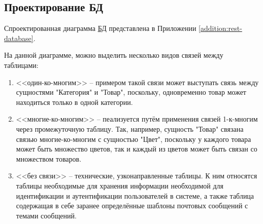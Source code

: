 \subsection{Проектирование БД}\label{subsec:design-db}\indent

Спроектированная диаграмма \hyperlink{gloss:db}{БД} представлена в Приложении \ref{addition:rest-database}.

На данной диаграмме, можно выделить несколько видов связей между таблицами:

\begin{enumerate}
    \item <<один-ко-многим>> – примером такой связи может выступать связь между сущностями "Категория" и "Товар", поскольку, одновременно товар может находиться только в одной категории.
    \item <<многие-ко-многим>> – пеализуется путём применения связей 1-к-многим через промежуточную таблицу. Так, например, сущность "Товар" связана связью многие-ко-многим с сущностью "Цвет",
    поскольку у каждого товара может быть множество цветов, так и каждый из цветов может быть связан со множеством товаров. 
    \item <<без связи>> – технические, узконаправленные таблицы. К ним относятся таблицы необходимые для хранения информации необходимой для идентификации и аутентификации пользователей в системе, 
    а также таблица содержащая в себе заранее определённые шаблоны почтовых сообщений с темами сообщений.
\end{enumerate}